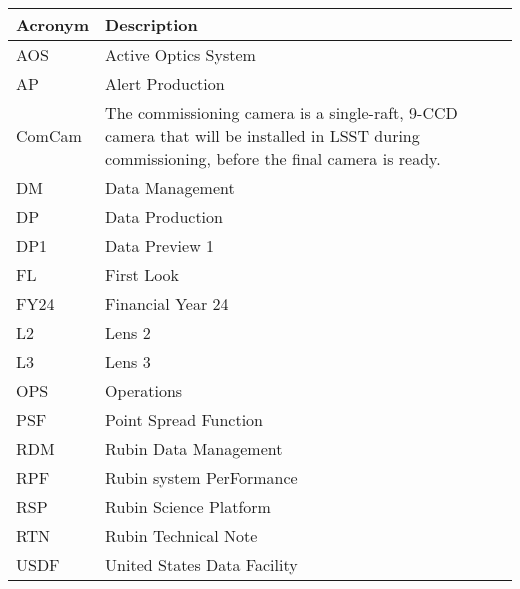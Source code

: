 \addtocounter{table}{-1}
\begin{longtable}{p{}p{}}\hline
\textbf{Acronym} & \textbf{Description}  \\\hline

AOS & Active Optics System \\\hline
AP & Alert Production \\\hline
ComCam & The commissioning camera is a single-raft, 9-CCD camera that will be installed in LSST during commissioning, before the final camera is ready. \\\hline
DM & Data Management \\\hline
DP & Data Production \\\hline
DP1 & Data Preview 1 \\\hline
FL & First Look \\\hline
FY24 & Financial Year 24 \\\hline
L2 & Lens 2 \\\hline
L3 & Lens 3 \\\hline
OPS & Operations \\\hline
PSF & Point Spread Function \\\hline
RDM & Rubin Data Management \\\hline
RPF & Rubin system PerFormance \\\hline
RSP & Rubin Science Platform \\\hline
RTN & Rubin Technical Note \\\hline
USDF & United States Data Facility \\\hline
\end{longtable}
